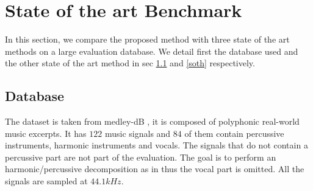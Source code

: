 \documentclass[journal]{IEEEtran}
\begin{document}
%   
%
%
%



\section{State of the art Benchmark}\label{sec:stateoftheart}

In this section, we compare the proposed method with three state of the art methods on a large evaluation database. We detail first the database used and the other state of the art method in sec \ref{database} and \ref{soth} respectively.  


\subsection{Database}\label{database}

The dataset is taken from medley-dB \cite{bittner2014medleydb}, it is composed of polyphonic real-world music excerpts. It has $122$ music signals and $84$ of them contain percussive instruments, harmonic instruments and vocals. The signals that do not contain a percussive part are not part of the evaluation. The goal is to perform an harmonic/percussive decomposition as in \cite{canadas2014percussive} thus the vocal part is omitted. All the signals are sampled at $44.1kHz$.
\end{document}
